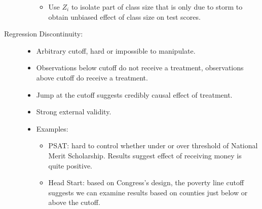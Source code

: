 \documentclass[10pt]{extarticle}
\begin{document}
\begin{description}
\begin{itemize}
\begin{itemize}
          \item Use $Z_i$ to isolate part of class size that is only due to storm to obtain unbiased effect of class size on test scores.
        \end{itemize}
      \end{itemize}
    \item[Regression Discontinuity:]\hfill
      \begin{itemize}
        \item Arbitrary cutoff, hard or impossible to manipulate.
        \item Observations below cutoff do not receive a treatment, observations above cutoff do receive a treatment.
        \item Jump at the cutoff suggests credibly causal effect of treatment.
        \item Strong external validity.
        \item Examples:
          \begin{itemize}
            \item PSAT: hard to control whether under or over threshold of National Merit Scholarship. Results suggest effect of receiving money is quite positive.
            \item Head Start: based on Congress's design, the poverty line cutoff suggests we can examine results based on counties just below or above the cutoff.
          \end{itemize}
      \end{itemize}
  \end{description}
\end{document}

